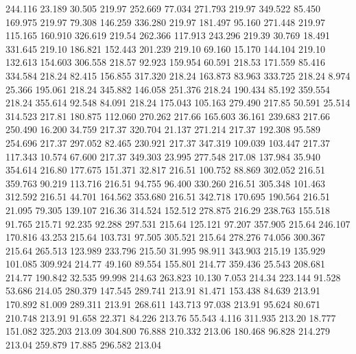  244.116   23.189   30.505       219.97
 252.669   77.034  271.793       219.97
 349.522   85.450  169.975       219.97
  79.308  146.259  336.280       219.97
 181.497   95.160  271.448       219.97
 115.165  160.910  326.619       219.54
 262.366  117.913  243.296       219.39
  30.769   18.491  331.645       219.10
 186.821  152.443  201.239       219.10
  69.160   15.170  144.104       219.10
 132.613  154.603  306.558       218.57
  92.923  159.954   60.591       218.53
 171.559   85.416  334.584       218.24
  82.415  156.855  317.320       218.24
 163.873   83.963  333.725       218.24
   8.974   25.366  195.061       218.24
 345.882  146.058  251.376       218.24
 190.434   85.192  359.554       218.24
 355.614   92.548   84.091       218.24
 175.043  105.163  279.490       217.85
  50.591   25.514  314.523       217.81
 180.875  112.060  270.262       217.66
 165.603   36.161  239.683       217.66
 250.490   16.200   34.759       217.37
 320.704   21.137  271.214       217.37
 192.308   95.589  254.696       217.37
 297.052   82.465  230.921       217.37
 347.319  109.039  103.447       217.37
 117.343   10.574   67.600       217.37
 349.303   23.995  277.548       217.08
 137.984   35.940  354.614       216.80
 177.675  151.371   32.817       216.51
 100.752   88.869  302.052       216.51
 359.763   90.219  113.716       216.51
  94.755   96.400  330.260       216.51
 305.348  101.463  312.592       216.51
  44.701  164.562  353.680       216.51
 342.718  170.695  190.564       216.51
  21.095   79.305  139.107       216.36
 314.524  152.512  278.875       216.29
 238.763  155.518   91.765       215.71
  92.235   92.288  297.531       215.64
 125.121   97.207  357.905       215.64
 246.107  170.816   43.253       215.64
 103.731   97.505  305.521       215.64
 278.276   74.056  300.367       215.64
 265.513  123.989  233.796       215.50
  31.995   98.911  343.903       215.19
 135.929  101.085  309.924       214.77
  49.160   89.554  155.801       214.77
 359.436   25.543  208.681       214.77
 190.842   32.535   99.998       214.63
 263.823   10.130    7.053       214.34
 223.144   91.528   53.686       214.05
 280.379  147.545  289.741       213.91
  81.471  153.438   84.639       213.91
 170.892   81.009  289.311       213.91
 268.611  143.713   97.038       213.91
  95.624   80.671  210.748       213.91
  91.658   22.371   84.226       213.76
  55.543    4.116  311.935       213.20
  18.777  151.082  325.203       213.09
 304.800   76.888  210.332       213.06
 180.468   96.828  214.279       213.04
 259.879   17.885  296.582       213.04
